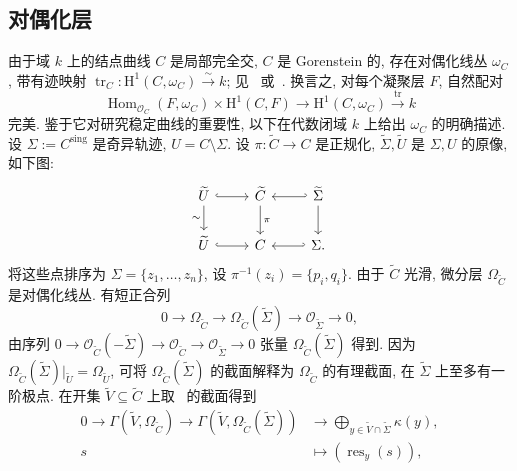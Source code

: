 \subsection{对偶化层}\label{src:6.2.4-subsection}
由于域 $k$ 上的结点曲线 $C$ 是局部完全交, $C$ 是 Gorenstein 的, 存在对偶化线丛 $\omega_C$, 带有迹映射 $\operatorname{tr}_C:\mathrm H^1(C,\allowbreak \omega_C)\xrightarrow{\sim}k$; 见~\cite[III.7.11]{Har77} 或~\cite[\S IV]{Ser88}. 换言之, 对每个凝聚层 $F$, 自然配对
\[
\operatorname{Hom}_{\mathcal O_C}(F,\omega_C)\times\mathrm H^1(C,F)\to\mathrm H^1(C,\omega_C)\xrightarrow{\operatorname{tr}}k
\]
完美. 鉴于它对研究稳定曲线的重要性, 以下在代数闭域 $k$ 上给出 $\omega_C$ 的明确描述. 设 $\Sigma:=C^{\mathrm{sing}}$ 是奇异轨迹, $U=C\setminus\Sigma$. 设 $\pi:\widetilde C\to\allowbreak C$ 是正规化, $\widetilde\Sigma,\allowbreak \widetilde U$ 是 $\Sigma,\allowbreak U$ 的原像, 如下图:
\begin{equation}\label{src:6.2.15}
\begin{tikzcd}
\widetilde U\arrow[r,hook]\arrow[d,"\sim"']&\widetilde C\arrow[d,"\pi"]&\widetilde\Sigma\arrow[l,hook']\arrow[d]\\
\widetilde U\arrow[r,hook]&C&\Sigma.\arrow[l,hook']
\end{tikzcd}
\end{equation}
将这些点排序为 $\Sigma=\{z_1,\allowbreak \ldots,\allowbreak z_n\}$, 设 $\pi^{-1}(z_i)=\{p_i,\allowbreak q_i\}$. 由于 $\widetilde C$ 光滑, 微分层 $\Omega_{\widetilde C}$ 是对偶化线丛. 有短正合列
\begin{equation}\label{src:6.2.16}
0\to\Omega_{\widetilde C}\to\Omega_{\widetilde C}(\widetilde\Sigma)\to\mathcal O_{\widetilde\Sigma}\to0,
\end{equation}
由序列 $0\to\mathcal O_{\widetilde C}(-\widetilde\Sigma)\to\mathcal O_{\widetilde C}\to\mathcal O_{\widetilde\Sigma}\to0$ 张量 $\Omega_{\widetilde C}(\widetilde\Sigma)$ 得到. 因为 $\Omega_{\widetilde C}(\widetilde\Sigma)|_{\widetilde U}=\Omega_{\widetilde U}$, 可将 $\Omega_{\widetilde C}(\widetilde\Sigma)$ 的截面解释为 $\Omega_{\widetilde C}$ 的有理截面, 在 $\widetilde\Sigma$ 上至多有一阶极点. 在开集 $\widetilde V\subseteq\widetilde C$ 上取~ 的截面得到
\begin{equation}\label{src:6.2.17}
\begin{aligned}
0\to\Gamma(\widetilde V,\Omega_{\widetilde C})\to\Gamma(\widetilde V,\Omega_{\widetilde C}(\widetilde\Sigma))&\to\bigoplus_{y\in\widetilde V\cap\widetilde\Sigma}\kappa(y),\\
s&\mapsto(\operatorname{res}_y(s)),
\end{aligned}
\end{equation}
